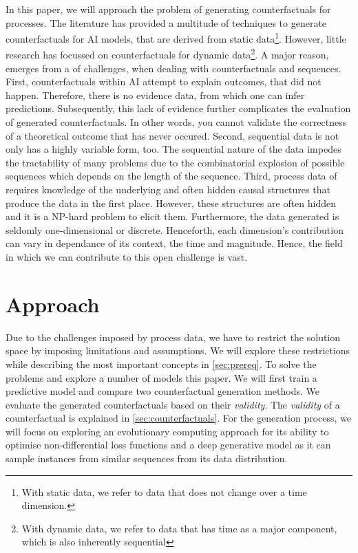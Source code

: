\documentclass[./../../paper.tex]{subfiles}
\begin{document}
In this paper, we will approach the problem of generating counterfactuals for processes. The literature has provided a multitude of techniques to generate counterfactuals for AI models, that are derived from static data\footnote{With static data, we refer to data that does not change over a time dimension.}. However, little research has focussed on counterfactuals for dynamic data\footnote{With dynamic data, we refer to data that has time as a major component, which is also inherently sequential}. A major reason, emerges from a  of challenges, when dealing with counterfactuals and sequences.
First, counterfactuals within AI attempt to explain outcomes, that did not happen. Therefore, there is no evidence data, from which one can infer predictions. Subsequently, this lack of evidence further complicates the evaluation of generated counterfactuals. In other words, you cannot validate the correctness of a theoretical outcome that has never occured.
Second, sequential data is not only has a highly variable form, too\needscite{}. The sequential nature of the data impedes the tractability of many problems due to the combinatorial explosion of possible sequences which depends on the length of the sequence.
Third, process data of requires knowledge of the underlying and often hidden causal structures that produce the data in the first place. However, these structures are often hidden and it is a NP-hard problem to elicit them. Furthermore, the data generated is seldomly one-dimensional or discrete. Henceforth, each dimension's contribution can vary in dependance of its context, the time and magnitude.
Hence, the field in which we can contribute to this open challenge is vast. 

\section{Approach}
Due to the challenges imposed by process data, we have to restrict the solution space by imposing limitations and assumptions. We will explore these restrictions while describing the most important concepts in \autoref{sec:prereq}. To solve the problems and explore a number of models this paper. We will first train a predictive model and compare two counterfactual generation methods. We evaluate the generated counterfactuals based on their \emph{validity}. The \emph{validity} of a counterfactual is explained in \autoref{sec:counterfactuals}. For the generation process, we will focus on exploring an evolutionary computing approach for its ability to optimise non-differential loss functions and a deep generative model as it can sample instances from similar sequences from its data distribution.      
\end{document}
